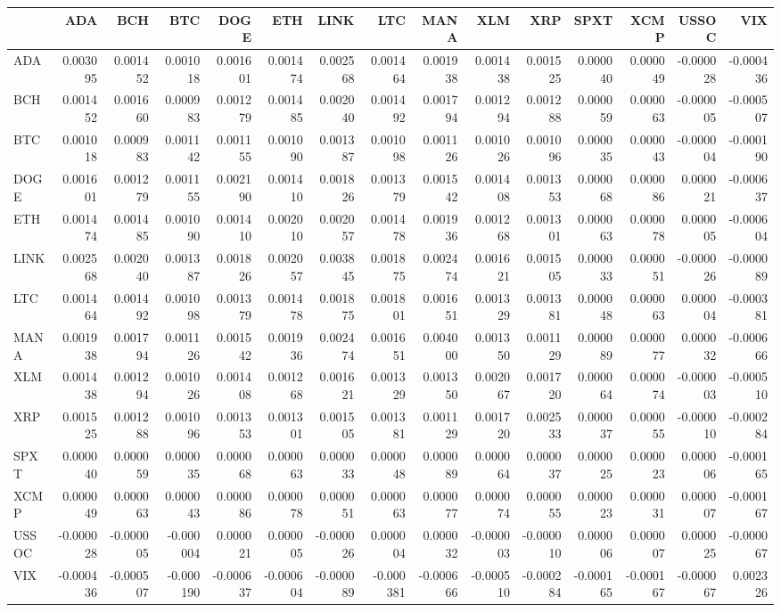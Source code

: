\begin{tabular}{lrrrrrrrrrrrrrr}
\toprule
 & ADA & BCH & BTC & DOGE & ETH & LINK & LTC & MANA & XLM & XRP & SPXT & XCMP & USSOC & VIX \\
\midrule
ADA & 0.003095 & 0.001452 & 0.001018 & 0.001601 & 0.001474 & 0.002568 & 0.001464 & 0.001938 & 0.001438 & 0.001525 & 0.000040 & 0.000049 & -0.000028 & -0.000436 \\
BCH & 0.001452 & 0.001660 & 0.000983 & 0.001279 & 0.001485 & 0.002040 & 0.001492 & 0.001794 & 0.001294 & 0.001288 & 0.000059 & 0.000063 & -0.000005 & -0.000507 \\
BTC & 0.001018 & 0.000983 & 0.001142 & 0.001155 & 0.001090 & 0.001387 & 0.001098 & 0.001126 & 0.001026 & 0.001096 & 0.000035 & 0.000043 & -0.000004 & -0.000190 \\
DOGE & 0.001601 & 0.001279 & 0.001155 & 0.002190 & 0.001410 & 0.001826 & 0.001379 & 0.001542 & 0.001408 & 0.001353 & 0.000068 & 0.000086 & 0.000021 & -0.000637 \\
ETH & 0.001474 & 0.001485 & 0.001090 & 0.001410 & 0.002010 & 0.002057 & 0.001478 & 0.001936 & 0.001268 & 0.001301 & 0.000063 & 0.000078 & 0.000005 & -0.000604 \\
LINK & 0.002568 & 0.002040 & 0.001387 & 0.001826 & 0.002057 & 0.003845 & 0.001875 & 0.002474 & 0.001621 & 0.001505 & 0.000033 & 0.000051 & -0.000026 & -0.000089 \\
LTC & 0.001464 & 0.001492 & 0.001098 & 0.001379 & 0.001478 & 0.001875 & 0.001801 & 0.001651 & 0.001329 & 0.001381 & 0.000048 & 0.000063 & 0.000004 & -0.000381 \\
MANA & 0.001938 & 0.001794 & 0.001126 & 0.001542 & 0.001936 & 0.002474 & 0.001651 & 0.004000 & 0.001350 & 0.001129 & 0.000089 & 0.000077 & 0.000032 & -0.000666 \\
XLM & 0.001438 & 0.001294 & 0.001026 & 0.001408 & 0.001268 & 0.001621 & 0.001329 & 0.001350 & 0.002067 & 0.001720 & 0.000064 & 0.000074 & -0.000003 & -0.000510 \\
XRP & 0.001525 & 0.001288 & 0.001096 & 0.001353 & 0.001301 & 0.001505 & 0.001381 & 0.001129 & 0.001720 & 0.002533 & 0.000037 & 0.000055 & -0.000010 & -0.000284 \\
SPXT & 0.000040 & 0.000059 & 0.000035 & 0.000068 & 0.000063 & 0.000033 & 0.000048 & 0.000089 & 0.000064 & 0.000037 & 0.000025 & 0.000023 & 0.000006 & -0.000165 \\
XCMP & 0.000049 & 0.000063 & 0.000043 & 0.000086 & 0.000078 & 0.000051 & 0.000063 & 0.000077 & 0.000074 & 0.000055 & 0.000023 & 0.000031 & 0.000007 & -0.000167 \\
USSOC & -0.000028 & -0.000005 & -0.000004 & 0.000021 & 0.000005 & -0.000026 & 0.000004 & 0.000032 & -0.000003 & -0.000010 & 0.000006 & 0.000007 & 0.000025 & -0.000067 \\
VIX & -0.000436 & -0.000507 & -0.000190 & -0.000637 & -0.000604 & -0.000089 & -0.000381 & -0.000666 & -0.000510 & -0.000284 & -0.000165 & -0.000167 & -0.000067 & 0.002326 \\
\bottomrule
\end{tabular}
